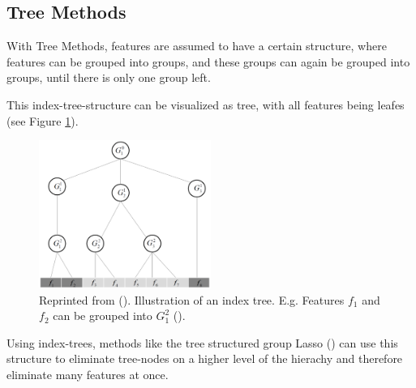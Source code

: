\subsection{Tree Methods}
\label{sec:methods.structured.tree}


With Tree Methods, features are assumed to have a certain structure, where
features can be grouped into groups, and these groups can again be grouped into
groups, until there is only one group left.

This index-tree-structure can be visualized as tree, with all features being
leafes (see Figure \ref{fig:methods.structured.tree.lasso}).

\begin{figure}[!ht]
  \centering 
  \includegraphics[width=0.5\textwidth]{chapters/methods/structured/tree_lasso}
  \caption{Reprinted from (\cite{Tang:04}). Illustration of an index tree.
  E.g. Features $f_1$ and $f_2$ can be grouped into $G_1^2$ (\cite{Tang:04}).}
  \label{fig:methods.structured.tree.lasso}
\end{figure}

Using index-trees, methods like the tree structured group Lasso (\cite{Kim:10})
can use this structure to eliminate tree-nodes on a higher level of the hierachy and
therefore eliminate many features at once.